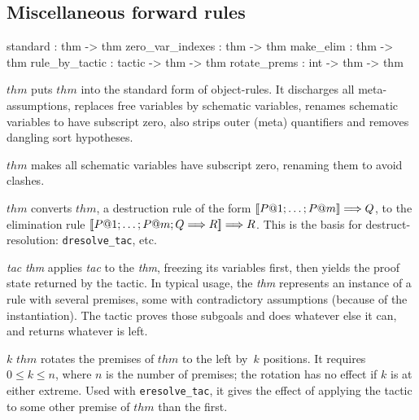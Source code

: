 \subsection{Miscellaneous forward rules}\label{MiscellaneousForwardRules}
\begin{ttbox} 
standard         :           thm -> thm
zero_var_indexes :           thm -> thm
make_elim        :           thm -> thm
rule_by_tactic   : tactic -> thm -> thm
rotate_prems     :    int -> thm -> thm
\end{ttbox}
\begin{ttdescription}
\item[\ttindexbold{standard} $thm$] puts $thm$ into the standard form
  of object-rules.  It discharges all meta-assumptions, replaces free
  variables by schematic variables, renames schematic variables to
  have subscript zero, also strips outer (meta) quantifiers and
  removes dangling sort hypotheses.

\item[\ttindexbold{zero_var_indexes} $thm$] 
makes all schematic variables have subscript zero, renaming them to avoid
clashes. 

\item[\ttindexbold{make_elim} $thm$] 
converts $thm$, a destruction rule of the form $\mathopen{[\![} P@1;\ldots;P@m\mathclose{]\!]}\Longrightarrow
Q$, to the elimination rule $\mathopen{[\![} P@1; \ldots; P@m; Q\Longrightarrow R\mathclose{]\!]}\Longrightarrow R$.  This
is the basis for destruct-resolution: {\tt dresolve_tac}, etc.

\item[\ttindexbold{rule_by_tactic} {\it tac} {\it thm}] 
  applies {\it tac\/} to the {\it thm}, freezing its variables first, then
  yields the proof state returned by the tactic.  In typical usage, the
  {\it thm\/} represents an instance of a rule with several premises, some
  with contradictory assumptions (because of the instantiation).  The
  tactic proves those subgoals and does whatever else it can, and returns
  whatever is left.
  
\item[\ttindexbold{rotate_prems} $k$ $thm$] rotates the premises of $thm$ to
  the left by~$k$ positions.  It requires $0\leq k\leq n$, where $n$ is the
  number of premises; the rotation has no effect if $k$ is at either extreme.
  Used with \texttt{eresolve_tac}, it gives the effect of applying the tactic to some other premise
  of $thm$ than the first.
\end{ttdescription}


